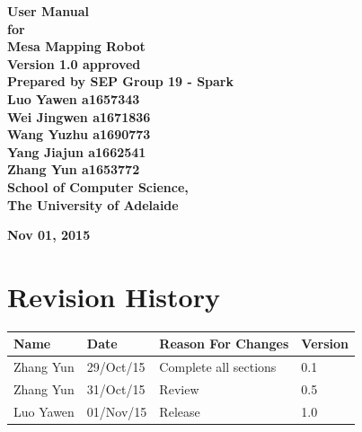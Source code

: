 \documentclass[11pt, a4paper]{article}
\begin{document}
\begin{titlepage}

\begin{center}

	\vspace{0.5 cm}
	\fontsize{35}{35}\selectfont\bf {User Manual}\\
	\vspace{0.5 cm}
	\huge{\bfseries for}\\
	\vspace{0.5 cm}
	\fontsize{35}{40}\selectfont\bf {Mesa Mapping Robot}\\
	
	\vspace{2cm}
	\Large\textbf{ Version 1.0 approved}\\
	
	\vspace{1.5cm}
	\Large\textbf {Prepared by SEP Group 19 - Spark\\
								Luo Yawen a1657343 \\
								Wei Jingwen a1671836 \\
								Wang Yuzhu a1690773 \\
								Yang Jiajun a1662541\\
								Zhang Yun a1653772}\\
		
	\vspace{2cm}
	\Large\textbf{ School of Computer Science,\\
								The University of Adelaide}\\
	\vspace{2cm}
	
	\Large\textbf{Nov 01, 2015}\\

\end{center}

\end{titlepage}

\tableofcontents

\vspace{1cm}
\section*{Revision History}
\small
\begin{tabular} 
	 {|m{3cm}|m{2cm}|m{8cm}|m{2cm}|}
	\hline
	\textbf{Name} &  \textbf{Date} & \textbf{Reason For Changes} & \textbf{Version} \\ [0.5ex]
	\hline
	Zhang Yun & 29/Oct/15 & Complete all sections & 0.1 \\ [0.5ex]
	\hline
	Zhang Yun & 31/Oct/15 & Review & 0.5 \\ [0.5ex]
	\hline
	Luo Yawen & 01/Nov/15 & Release & 1.0 \\ [0.5ex]
	\hline
\end{tabular}
\cleardoublepage
\end{document}
